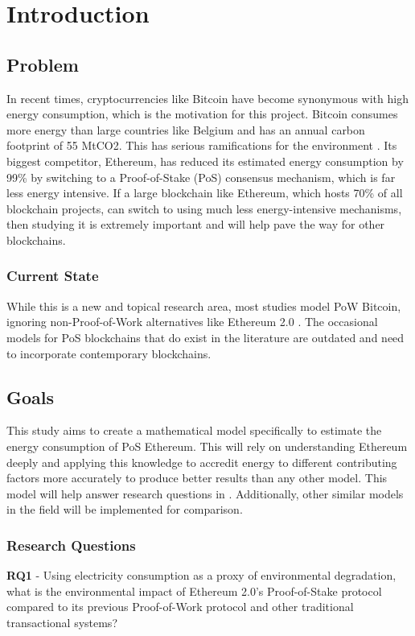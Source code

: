 \chapter{Introduction}

\section{Problem}
In recent times, cryptocurrencies like Bitcoin have become synonymous with high energy consumption, which is the motivation for this project. Bitcoin consumes more energy than large countries like Belgium and has an annual carbon footprint of 55 MtCO2. This has serious ramifications for the environment \cite{BitcoinDigiconomist}. Its biggest competitor, Ethereum, has reduced its estimated energy consumption by 99\% by switching to a Proof-of-Stake (PoS) consensus mechanism, which is far less energy intensive. If a large blockchain like Ethereum, which hosts 70\% of all blockchain projects, can switch to using much less energy-intensive mechanisms, then studying it is extremely important and will help pave the way for other blockchains. 

\subsection{Current State}
While this is a new and topical research area, most studies model PoW Bitcoin, ignoring non-Proof-of-Work alternatives like Ethereum 2.0 \cite{Lei2021BestRecommendations}. The occasional models for PoS blockchains that do exist in the literature are outdated and need to incorporate contemporary blockchains. 

\section{Goals}
This study aims to create a mathematical model specifically to estimate the energy consumption of PoS Ethereum. This will rely on understanding Ethereum deeply and applying this knowledge to accredit energy to different contributing factors more accurately to produce better results than any other model. This model will help answer research questions in . Additionally, other similar models in the field will be implemented for comparison.

\subsection{Research Questions}
\label{ResearchQuestions}
\textbf{RQ1} - Using electricity consumption as a proxy of environmental degradation, what is the environmental impact of Ethereum 2.0's Proof-of-Stake protocol compared to its previous Proof-of-Work protocol and other traditional transactional systems?

